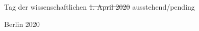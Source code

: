 \begin{titlepage}
\begin{center}
\begin{varwidth}{\textwidth}
      Tag der wissenschaftlichen \st{1. April 2020} ausstehend/pending
    \end{varwidth}
  \end{center}
  \vspace{0.65cm}
  \begin{center}
    Berlin 2020

    \vfill

    {\textcolor{white}{\sffamily\docdate}}
  \end{center}
\end{titlepage}
